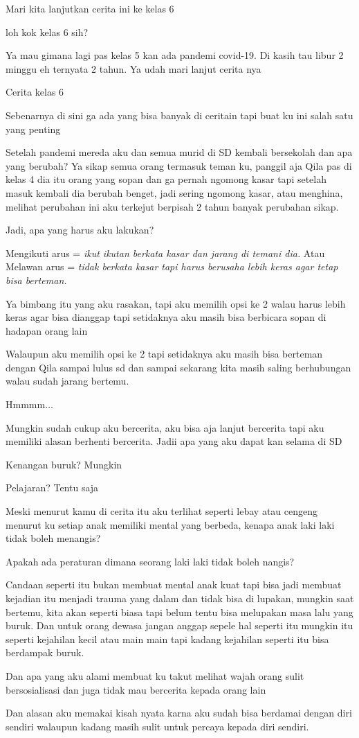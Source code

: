 Mari kita lanjutkan cerita ini ke kelas 6


loh kok kelas 6 sih?


Ya mau gimana lagi pas kelas 5 kan ada pandemi covid-19. Di kasih tau libur 2 minggu eh ternyata 2 tahun. Ya udah mari lanjut cerita nya


Cerita kelas 6


Sebenarnya di sini ga ada yang bisa banyak di ceritain tapi buat ku ini salah satu yang penting


Setelah pandemi mereda aku dan semua murid di SD kembali bersekolah dan apa yang berubah? Ya sikap semua orang termasuk teman ku, panggil aja Qila pas di kelas 4 dia itu orang yang sopan dan ga pernah ngomong kasar tapi setelah masuk kembali dia berubah benget, jadi sering ngomong kasar, atau menghina, melihat perubahan ini aku terkejut berpisah 2 tahun banyak perubahan sikap.


Jadi, apa yang harus aku lakukan?


Mengikuti arus = \textit{ikut ikutan berkata kasar dan jarang di temani dia.} Atau Melawan arus = \textit{tidak berkata kasar tapi harus berusaha lebih keras agar tetap bisa berteman.}


Ya bimbang itu yang aku rasakan, tapi aku memilih opsi ke 2 walau harus lebih keras agar bisa dianggap tapi setidaknya aku masih bisa berbicara sopan di hadapan orang lain


Walaupun aku memilih opsi ke 2 tapi setidaknya aku masih bisa berteman dengan Qila sampai lulus sd dan sampai sekarang kita masih saling berhubungan walau sudah jarang bertemu.


Hmmmm$\dots$


Mungkin sudah cukup aku bercerita, aku bisa aja lanjut bercerita tapi aku memiliki alasan berhenti bercerita. 
Jadii apa yang aku dapat kan selama di SD


Kenangan buruk? Mungkin


Pelajaran? Tentu saja


Meski menurut kamu di cerita itu aku terlihat seperti lebay atau cengeng menurut ku setiap anak memiliki mental yang berbeda, kenapa anak laki laki tidak boleh menangis?


Apakah ada peraturan dimana seorang laki laki tidak boleh nangis?


Candaan seperti itu bukan membuat mental anak kuat tapi bisa jadi membuat kejadian itu menjadi trauma yang dalam dan tidak bisa di lupakan, mungkin saat bertemu, kita akan seperti biasa tapi belum tentu bisa melupakan masa lalu yang buruk. Dan untuk orang dewasa jangan anggap sepele hal seperti itu mungkin itu seperti kejahilan kecil atau main main tapi kadang kejahilan seperti itu bisa berdampak buruk.


Dan apa yang aku alami membuat ku takut melihat wajah orang sulit bersosialisasi dan juga tidak mau bercerita kepada orang lain


Dan alasan aku memakai kisah nyata karna aku sudah bisa berdamai dengan diri sendiri walaupun kadang masih sulit untuk percaya kepada diri sendiri.

\jedahias
